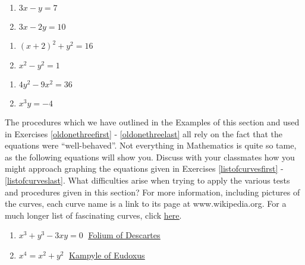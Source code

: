\begin{multicols}{2}
\begin{enumerate}
\setcounter{enumi}{\value{HW}}

\item $3x - y = 7$
\item  $3x-2y = 10$

\setcounter{HW}{\value{enumi}}
\end{enumerate}
\end{multicols}

\begin{multicols}{2}
\begin{enumerate}
\setcounter{enumi}{\value{HW}}

\item  $(x+2)^2+y^2 = 16$

\item $x^{2} - y^{2} = 1$

\setcounter{HW}{\value{enumi}}
\end{enumerate}
\end{multicols}

\begin{multicols}{2}
\begin{enumerate}
\setcounter{enumi}{\value{HW}}

\item  $4y^2 - 9x^2 = 36$
\item $x^{3}y = -4$ \label{oldonethreelast}

\setcounter{HW}{\value{enumi}}
\end{enumerate}
\end{multicols}

The procedures which we have outlined in the Examples of this section and used in Exercises \ref{oldonethreefirst} -  \ref{oldonethreelast} all rely on the fact that the equations were ``well-behaved''.  Not everything in Mathematics is quite so tame, as the following equations will show you.  Discuss with your classmates how you might approach graphing the equations given in Exercises \ref{listofcurvesfirst} - \ref{listofcurveslast}.  What difficulties arise when trying to apply the various tests and procedures given in this section?  For more information, including pictures of the curves, each curve name is a link to its page at www.wikipedia.org.  For a much longer list of fascinating curves, click \href{http://en.wikipedia.org/wiki/List_of_curves}{\underline{here}}.


\begin{multicols}{2}
\begin{enumerate}
\setcounter{enumi}{\value{HW}}

\item \label{listofcurvesfirst} $x^{3} + y^{3} - 3xy = 0\;$ \href{http://en.wikipedia.org/wiki/Folium_of_descartes}{\underline{Folium of Descartes}}
\item $x^{4} = x^{2} + y^{2}\;$ \href{http://en.wikipedia.org/wiki/Kampyle_of_Eudoxus}{\underline{Kampyle of Eudoxus}}
\setcounter{HW}{\value{enumi}}
\end{enumerate}
\end{multicols}

